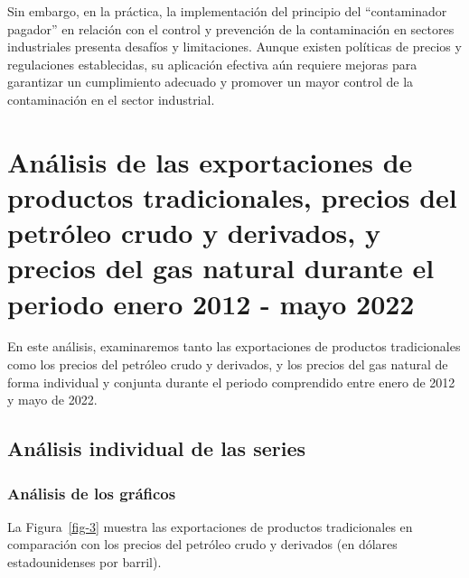 \documentclass[
  letterpaper,
  DIV=11,
  numbers=noendperiod]{scrartcl}
\begin{document}
Sin embargo, en la práctica, la implementación del principio del
``contaminador pagador'' en relación con el control y prevención de la
contaminación en sectores industriales presenta desafíos y limitaciones.
Aunque existen políticas de precios y regulaciones establecidas, su
aplicación efectiva aún requiere mejoras para garantizar un cumplimiento
adecuado y promover un mayor control de la contaminación en el sector
industrial.

\hypertarget{anuxe1lisis-de-las-exportaciones-de-productos-tradicionales-precios-del-petruxf3leo-crudo-y-derivados-y-precios-del-gas-natural-durante-el-periodo-enero-2012---mayo-2022}{%
\section{Análisis de las exportaciones de productos tradicionales,
precios del petróleo crudo y derivados, y precios del gas natural
durante el periodo enero 2012 - mayo
2022}\label{anuxe1lisis-de-las-exportaciones-de-productos-tradicionales-precios-del-petruxf3leo-crudo-y-derivados-y-precios-del-gas-natural-durante-el-periodo-enero-2012---mayo-2022}}

En este análisis, examinaremos tanto las exportaciones de productos
tradicionales como los precios del petróleo crudo y derivados, y los
precios del gas natural de forma individual y conjunta durante el
periodo comprendido entre enero de 2012 y mayo de 2022.

\hypertarget{anuxe1lisis-individual-de-las-series}{%
\subsection{Análisis individual de las
series}\label{anuxe1lisis-individual-de-las-series}}

\hypertarget{anuxe1lisis-de-los-gruxe1ficos}{%
\subsubsection{Análisis de los
gráficos}\label{anuxe1lisis-de-los-gruxe1ficos}}

La Figura~\ref{fig-3} muestra las exportaciones de productos
tradicionales en comparación con los precios del petróleo crudo y
derivados (en dólares estadounidenses por barril).
\end{document}
